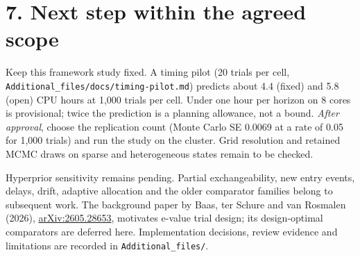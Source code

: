 \documentclass[10pt,a4paper]{article}
\begin{document}
\section*{7. Next step within the agreed scope}
Keep this framework study fixed. A timing pilot (20 trials per cell,
\texttt{Additional\_files/docs/timing-pilot.md}) predicts about 4.4 (fixed) and 5.8 (open)
CPU hours at 1,000 trials per cell. Under one hour per horizon on 8 cores is
provisional; twice the prediction is a planning allowance, not a bound.
\emph{After approval}, choose the replication
count (Monte Carlo SE 0.0069 at a rate of 0.05 for 1,000 trials) and run the
study on the cluster. Grid resolution and retained MCMC draws on sparse and
heterogeneous states remain to be checked.

Hyperprior sensitivity remains pending. Partial exchangeability, new entry
events, delays, drift, adaptive allocation and the older comparator families
belong to subsequent work. The background paper by Baas, ter Schure and
van Rosmalen (2026), \href{https://arxiv.org/abs/2605.28653}{arXiv:2605.28653},
motivates e-value trial design; its design-optimal comparators are deferred
here. Implementation decisions, review evidence and limitations are recorded
in \texttt{Additional\_files/}.
\end{document}
